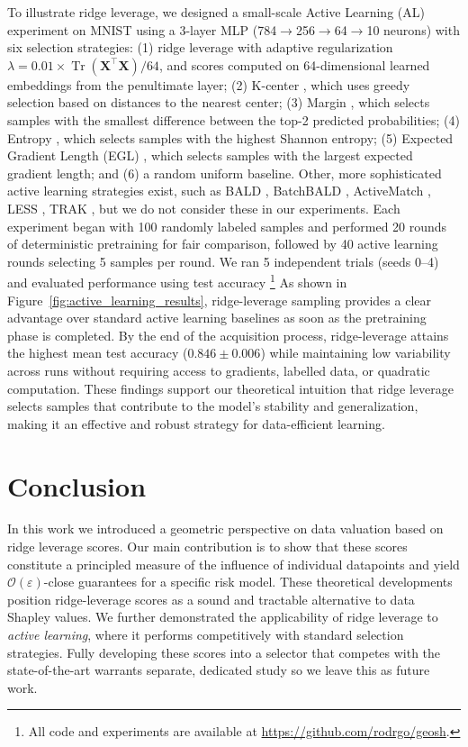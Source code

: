 \documentclass{article}
\newcommand{\1}{\mathbbm{1}}
\DeclareMathOperator{\Tr}{Tr}
\begin{document}
To illustrate ridge leverage, we designed a small-scale Active Learning (AL) experiment on MNIST \cite{lecun1998mnist} using a 3-layer MLP (784$\rightarrow$256$\rightarrow$64$\rightarrow$10 neurons) with six selection strategies: (1) ridge leverage with adaptive regularization $\lambda = 0.01 \times \Tr(\mathbf{X}^\top \mathbf{X})/64$, and scores computed on 64-dimensional learned embeddings from the penultimate layer; (2) K-center \cite{sener2017active}, which uses greedy selection based on distances to the nearest center; (3) Margin \cite{settles2009active}, which selects samples with the smallest difference between the top-2 predicted probabilities; (4) Entropy \cite{settles2009active}, which selects samples with the highest Shannon entropy; (5) Expected Gradient Length (EGL) \cite{huang2016active}, which selects samples with the largest expected gradient length; and (6) a random uniform baseline.
%
Other, more sophisticated active learning strategies exist, such as BALD \cite{houlsby2011bayesian}, BatchBALD \cite{kirsch2019batchbald}, ActiveMatch \cite{yuan2022activematch}, LESS \cite{xia2024less}, TRAK \cite{park2023trak}, but we do not consider these in our experiments.
%
Each experiment began with 100 randomly labeled samples and performed 20 rounds of deterministic pretraining for fair comparison, followed by 40 active learning rounds selecting 5 samples per round.
%
We ran 5 independent trials (seeds 0–4) and evaluated performance using test accuracy \footnote{All code and experiments are available at \url{https://github.com/rodrgo/geosh}.}
%
As shown in Figure~\ref{fig:active_learning_results}, ridge-leverage sampling provides a clear advantage over standard active learning baselines as soon as the pretraining phase is completed.
%
By the end of the acquisition process, ridge-leverage attains the highest mean test accuracy ($0.846 \pm 0.006$) while maintaining low variability across runs without requiring access to gradients, labelled data, or quadratic computation.
%
These findings support our theoretical intuition that ridge leverage selects samples that contribute to the model's stability and generalization, making it an effective and robust strategy for data-efficient learning.

\section{Conclusion}

In this work we introduced a geometric perspective on data valuation based on ridge leverage scores.
%
Our main contribution is to show that these scores constitute a principled measure of the influence of individual datapoints and yield $\mathcal{O}(\varepsilon)$-close guarantees for a specific risk model.
%
These theoretical developments position ridge-leverage scores as a sound and tractable alternative to data Shapley values.
%
We further demonstrated the applicability of ridge leverage to \emph{active learning}, where it performs competitively with standard selection strategies.
%
Fully developing these scores into a selector that competes with the state-of-the-art warrants separate, dedicated study so we leave this as future work.
\end{document}
